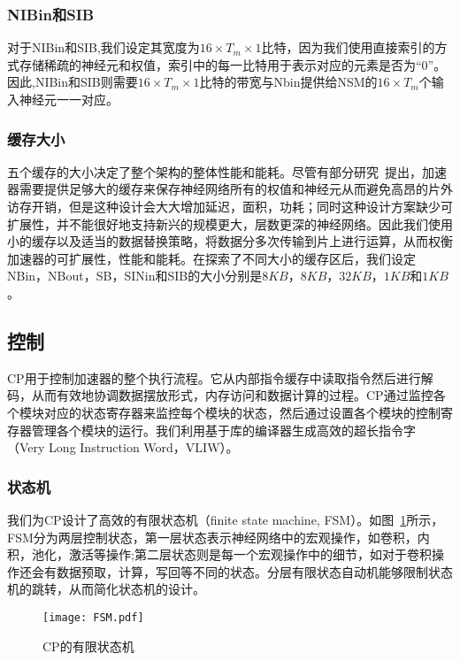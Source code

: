 \subsubsection{NIBin和SIB}
对于NIBin和SIB,我们设定其宽度为$16\times T_m\times 1$比特，因为我们使用直接索引的方式存储稀疏的神经元和权值，索引中的每一比特用于表示对应的元素是否为“0”。因此,NIBin和SIB则需要$16\times T_m\times 1$比特的带宽与Nbin提供给NSM的$16\times T_m$个输入神经元一一对应。

\subsubsection{缓存大小}
五个缓存的大小决定了整个架构的整体性能和能耗。尽管有部分研究~\cite{chen2014dadiannao,han2016eie}提出，加速器需要提供足够大的缓存来保存神经网络所有的权值和神经元从而避免高昂的片外访存开销，但是这种设计会大大增加延迟，面积，功耗；同时这种设计方案缺少可扩展性，并不能很好地支持新兴的规模更大，层数更深的神经网络。因此我们使用小的缓存以及适当的数据替换策略，将数据分多次传输到片上进行运算，从而权衡加速器的可扩展性，性能和能耗。在探索了不同大小的缓存区后，我们设定NBin，NBout，SB，SINin和SIB的大小分别是$8KB$，$8KB$，$32KB$，$1KB$和$1KB$。

\subsection{控制}
\label{subsec:control}

CP用于控制加速器的整个执行流程。它从内部指令缓存中读取指令然后进行解码，从而有效地协调数据摆放形式，内存访问和数据计算的过程。CP通过监控各个模块对应的状态寄存器来监控每个模块的状态，然后通过设置各个模块的控制寄存器管理各个模块的运行。我们利用基于库的编译器生成高效的超长指令字（Very Long Instruction Word，VLIW）。

\subsubsection{状态机}
我们为CP设计了高效的有限状态机（finite state machine, FSM）。如图~\ref{fig:FSM}所示，FSM分为两层控制状态，第一层状态表示神经网络中的宏观操作，如卷积，内积，池化，激活等操作;第二层状态则是每一个宏观操作中的细节，如对于卷积操作还会有数据预取，计算，写回等不同的状态。分层有限状态自动机能够限制状态机的跳转，从而简化状态机的设计。

\begin{figure}[h]
\centering
\texttt{[image: FSM.pdf]}
\caption{CP的有限状态机}
\label{fig:FSM}
\end{figure}

